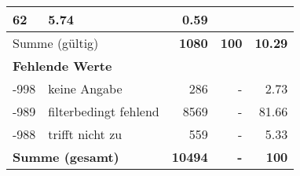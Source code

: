 \begin{longtable}{lXrrr}
       \num{62} &
       \num[round-mode=places,round-precision=2]{5,74} &
         \num[round-mode=places,round-precision=2]{0,59} \\
     \midrule
     \multicolumn{2}{l}{Summe (gültig)} &
       \textbf{\num{1080}} &
     \textbf{100} &
       \textbf{\num[round-mode=places,round-precision=2]{10,29}} \\
     \multicolumn{5}{l}{\textbf{Fehlende Werte}}\\
       -998 &
       keine Angabe &
         \num{286} &
        - &
         \num[round-mode=places,round-precision=2]{2,73} \\
       -989 &
       filterbedingt fehlend &
         \num{8569} &
        - &
         \num[round-mode=places,round-precision=2]{81,66} \\
       -988 &
       trifft nicht zu &
         \num{559} &
        - &
         \num[round-mode=places,round-precision=2]{5,33} \\
     \midrule
     \multicolumn{2}{l}{\textbf{Summe (gesamt)}} &
          \textbf{\num{10494}} &
        \textbf{-} &
        \textbf{100} \\
     \bottomrule
     \end{longtable}
     
